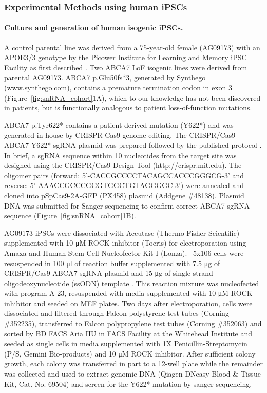 \subsubsection{Experimental Methods using human iPSCs} 

\paragraph{Culture and generation of human isogenic iPSCs.}
A control parental line was derived from a 75-year-old female (AG09173) with an APOE3/3 genotype by the Picower Institute for Learning and Memory iPSC Facility as first described \cite{Lin2018-zu}. Two ABCA7 LoF isogenic lines were derived from parental AG09173. ABCA7 p.Glu50fs*3, generated by Synthego (www.synthego.com), contains a premature termination codon in exon 3 (Figure~\ref{fig:snRNA_cohort}1A), which to our knowledge has not been discovered in patients, but is functionally analogous to patient loss-of-function mutations.

ABCA7 p.Tyr622* contains a patient-derived mutation (Y622*) \cite{De_Roeck2019-ee} and was generated in house by CRISPR-Cas9 genome editing. The CRISPR/Cas9-ABCA7-Y622* sgRNA plasmid was prepared followed by the published protocol \cite{Ran2013-lx}. In brief, a sgRNA sequence within 10 nucleotides from the target site was designed using the CRISPR/Cas9 Design Tool (http://crispr.mit.edu). The oligomer pairs (forward: 5’-CACCGCCCCTACAGCCACCCGGGCG-3’ and reverse: 5’-AAACCGCCCGGGTGGCTGTAGGGGC-3’) were annealed and cloned into pSpCas9-2A-GFP (PX458) plasmid (Addgene \#48138). Plasmid DNA was submitted for Sanger sequencing to confirm correct ABCA7 sgRNA sequence (Figure~\ref{fig:snRNA_cohort}1B).

AG09173 iPSCs were dissociated with Accutase (Thermo Fisher Scientific) supplemented with 10 μM ROCK inhibitor (Tocris) for electroporation using Amaxa and Human Stem Cell Nucleofector Kit I (Lonza). ~5x106 cells were resuspended in 100 μl of reaction buffer supplemented with 7.5 μg of CRISPR/Cas9-ABCA7 sgRNA plasmid and 15 μg of single-strand oligodeoxynucleotide (ssODN) template . This reaction mixture was nucleofected with program A-23, resuspended with media supplemented with 10 μM ROCK inhibitor and seeded on MEF plates. Two days after electroporation, cells were dissociated and filtered through Falcon polystyrene test tubes (Corning \#352235), transferred to Falcon polypropylene test tubes (Corning \#352063) and sorted by BD FACS Aria IIU in FACS Facility at the Whitehead Institute and seeded as single cells in media supplemented with 1X Penicillin-Streptomycin (P/S, Gemini Bio-products) and 10 μM ROCK inhibitor. After sufficient colony growth, each colony was transferred in part to a 12-well plate while the remainder was collected and used to extract genomic DNA (Qiagen DNeasy Blood & Tissue Kit, Cat. No. 69504) and screen for the Y622* mutation by sanger sequencing.

